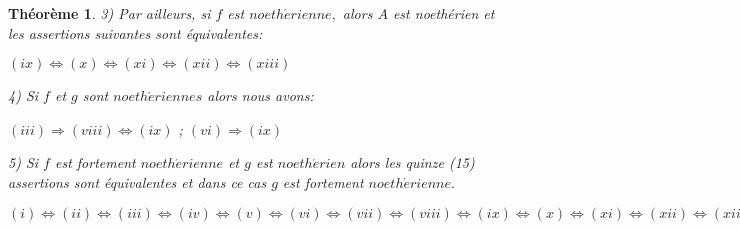 \documentclass[12pt, a4paper, oneside]{book}
\newtheorem{montheoreme}{Théorème}[chapter]
\begin{document}
\begin{montheoreme}
	3) Par ailleurs, si $f$ est $noeth\acute{e}rienne,$ alors $A$ est noethérien et les assertions suivantes sont équivalentes:
	
	$(ix)\Longleftrightarrow (x)\Longleftrightarrow (xi)\Longleftrightarrow
	(xii)\Longleftrightarrow (xiii)$
	
	4) Si $f$ et $g$ sont $noeth\acute{e}riennes$ alors nous avons:
	
	$(iii)\Longrightarrow (viii)\Longleftrightarrow (ix)$ ; $(vi)\Longrightarrow (ix)$
	
	5) Si $f$ est fortement $noeth\acute{e}rienne$ et $g$ est $noeth\acute{e}rien
	$ alors les quinze (15) assertions sont équivalentes et dans ce cas $g$
	est fortement $noeth\acute{e}rienne.$
	
	$(i)\Longleftrightarrow (ii)\Longleftrightarrow (iii)\Longleftrightarrow
	(iv)\Longleftrightarrow (v)\Longleftrightarrow (vi)\Longleftrightarrow
	(vii)\Longleftrightarrow (viii)\Longleftrightarrow (ix)\Longleftrightarrow
	(x)\Longleftrightarrow (xi)\Longleftrightarrow (xii)\Longleftrightarrow
	(xiii)\Longleftrightarrow (xiv)\Longleftrightarrow (xv).$
\end{montheoreme}
\end{document}
